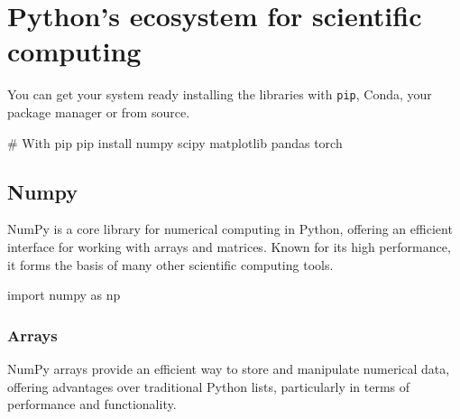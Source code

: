 
\chapter{Python's ecosystem for scientific computing}

You can get your system ready installing the libraries with \texttt{pip}, Conda, your package manager or from source. 
\begin{codeblock}[language=bash]
# With pip 
pip install numpy scipy matplotlib pandas torch
\end{codeblock}




\section{Numpy}

NumPy is a core library for numerical computing in Python, offering an efficient interface for
working with arrays and matrices. Known for its high performance, it forms the basis of many other
scientific computing tools.
\begin{codeblock}[language=python]
import numpy as np
\end{codeblock}

\subsection{Arrays}
NumPy arrays provide an efficient way to store and manipulate numerical data, offering
advantages over traditional Python lists, particularly in terms of performance and functionality.

